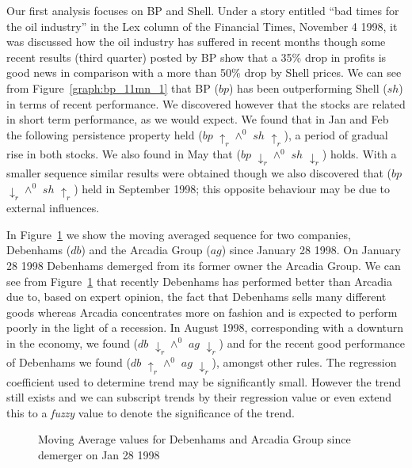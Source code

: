 Our first analysis
focuses on BP and Shell. Under a story entitled ``bad times for the
oil industry'' in the Lex column of the Financial Times, November 4
1998, it was discussed how the oil industry has suffered in recent
months though some recent results (third quarter) posted by BP show
that a 35\% drop in profits is good news in comparison with a more
than 50\% drop by Shell prices. We can see from
Figure~\ref{graph:bp_11mn_1} that BP ($bp$) has been outperforming
Shell ($sh$) in
terms of recent performance. We discovered however that the stocks are
related in short term performance, as we would expect. We found that
in Jan and Feb the following persistence property held 
($bp$ $\uparrow_r \wedge^0$ $sh$ $\uparrow_r$), a period of gradual
rise in both stocks. We also found in May that  ($bp$
$\downarrow_r \wedge^0$ $sh$ $\downarrow_r$) holds. With a smaller
sequence similar results 
were obtained though we also discovered that  ($bp$ $\downarrow_r
\wedge^0$ $sh$ $\uparrow_r$) held in September 1998; this opposite behaviour
may be due to external influences.

\medskip

In Figure~\ref{graph:deb_199_2} we show the moving averaged sequence
for two companies, Debenhams ($db$) and the Arcadia Group ($ag$) since
January 28 1998. On January 28 1998 Debenhams demerged from its former
owner the
Arcadia Group. We can see from Figure~\ref{graph:deb_199_2} that
recently Debenhams has performed better 
than Arcadia due to, based on expert opinion, the fact that Debenhams
sells many different goods whereas Arcadia concentrates more on fashion and
is expected to perform poorly in the light of a recession. In August
1998, corresponding with a downturn in the economy, we found
  ($db$ $\downarrow_r \wedge^0$ $ag$ $\downarrow_r$) and
for the recent good performance of Debenhams we found  ($db$
$\uparrow_r \wedge^0$ $ag$ $\downarrow_r$), amongst other rules. The
regression coefficient used to determine trend may be significantly
small. However the trend still exists and we can subscript trends by
their regression value or even extend this to a {\em fuzzy} value to denote the
significance of the trend.   


\begin{figure}
\centerline{}
\caption{\label{graph:deb_199_2}{Moving Average values for
Debenhams and Arcadia Group since demerger on Jan 28 1998}}
\end{figure}


